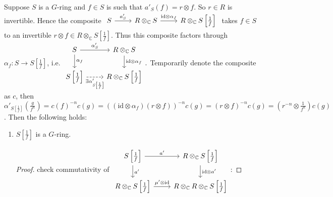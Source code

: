\documentclass{article}
\theoremstyle{definition}
\newcommand{\tensorC}[2]{#1\otimes_\mathbb C #2}
\newcommand{\tensor}[2]{#1\otimes#2}
\newcommand{\id}{\mathrm{id}}
\begin{document}
Suppose $S$ is a $G$-ring and $f\in S$ is such that $a'_S(f)=\tensor r f$. So $r\in R$ is invertible. Hence the composite
$
\begin{tikzcd}
  S \arrow[r, "a_S'"] & \tensorC R S \arrow[r, "\tensor\id{\alpha_f}"] & \tensorC R {S\left[\frac1f\right]}
\end{tikzcd}
$ takes $f\in S$ to an invertible $\tensor r f\in\tensorC R{S\left[\frac1f\right]}$. Thus this composite
factors through $\alpha_f:S\to S\left[\frac1f\right]$, i.e.
$
\begin{tikzcd}
  S \arrow[r, "\alpha'_S"]\arrow[d, "\alpha_f"]& \tensorC R S\arrow[d, "\tensor\id{\alpha_f}"] \\
  {S\left[\frac1f\right]}\arrow[r, dashed, "\exists\alpha'_{S\left[\frac1f\right]}"', description] & \tensorC R{S\left[\frac1f\right]}
\end{tikzcd}.
$ Temporarily denote the composite as $c$, then $\alpha'_{S\left[\frac1f\right]}(\frac g{f^n})=c(f)^{-n}c(g)=((\tensor\id{\alpha_f})(\tensor r f))^{-n}c(g)=
\left(\tensor rf\right)^{-n}c(g)=\left(\tensor{r^{-n}}{\frac1{f^n}}\right)c(g)$.
Then the following holds:
\begin{enumerate}
\item $S\left[\frac1f\right]$ is a $G$-ring.
  \begin{proof}
    check commutativity of
$
      \begin{tikzcd}
        {S\left[\frac1f\right]}\arrow[r, "a'"]\arrow[d, "a'"] & \tensorC R {S\left[\frac1f\right]} \arrow[d, "\tensor\id{a'}"]\\
        {\tensorC R{S\left[\frac1f\right]}}\arrow[r, "\tensor{\mu'}\id"] & \tensorC{\tensorC R R}{S\left[\frac1f\right]}
      \end{tikzcd}
$:
  \end{proof}
\end{enumerate}
\end{document}
